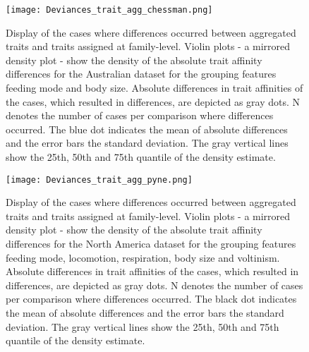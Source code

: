 \documentclass[../Draft_harmonization_paper.tex]{subfiles}
\begin{document}
\newpage

\begin{figure}[H]
  \centering
  \texttt{[image: Deviances\_trait\_agg\_chessman.png]}
  \caption{Display of the cases where differences occurred between aggregated traits and traits assigned at family-level. Violin plots - a mirrored density plot - show the density of the absolute trait affinity differences for the Australian dataset for the grouping features feeding mode and body size. Absolute differences in trait affinities of the cases, which resulted in differences, are depicted as gray dots. N denotes the number of cases per comparison where differences occurred. The blue dot indicates the mean of absolute differences and the error bars the standard deviation. The gray vertical lines show the 25th, 50th and 75th quantile of the density estimate.}
  \label{fig:diff_aggr_traits_chessman}
\end{figure}


\begin{figure}[H]
  \centering
  \texttt{[image: Deviances\_trait\_agg\_pyne.png]}
  \caption{Display of the cases where differences occurred between aggregated traits and traits assigned at family-level. Violin plots - a mirrored density plot - show the density of the absolute trait affinity differences for the North America dataset for the grouping features feeding mode, locomotion, respiration, body size and voltinism. Absolute differences in trait affinities of the cases, which resulted in differences, are depicted as gray dots. N denotes the number of cases per comparison where differences occurred. The black dot indicates the mean of absolute differences and the error bars the standard deviation. The gray vertical lines show the 25th, 50th and 75th quantile of the density estimate.}
  \label{fig:diff_aggr_traits_pyne}
\end{figure}
\end{document}
